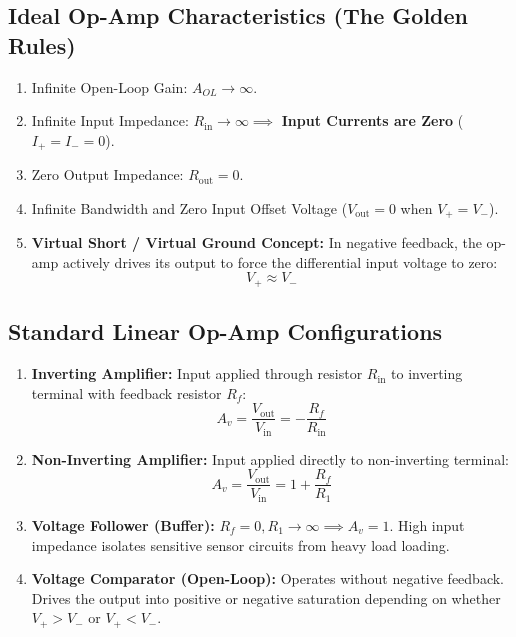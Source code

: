 \subsection{Ideal Op-Amp Characteristics (The Golden Rules)}
\begin{enumerate}[label=\bfseries\arabic*.]
    \item Infinite Open-Loop Gain: $A_{OL} \to \infty$.
    \item Infinite Input Impedance: $R_{\text{in}} \to \infty \implies$ \textbf{Input Currents are Zero} ($I_+ = I_- = 0$).
    \item Zero Output Impedance: $R_{\text{out}} = 0$.
    \item Infinite Bandwidth and Zero Input Offset Voltage ($V_{\text{out}} = 0$ when $V_+ = V_-$).
    \item \textbf{Virtual Short / Virtual Ground Concept:} In negative feedback, the op-amp actively drives its output to force the differential input voltage to zero:
    \begin{equation}
    \label{eq:virtual_short}
    V_+ \approx V_-
    \end{equation}
\end{enumerate}

\subsection{Standard Linear Op-Amp Configurations}
\begin{enumerate}[label=\bfseries\arabic*.]
    \item \textbf{Inverting Amplifier:} Input applied through resistor $R_{\text{in}}$ to inverting terminal with feedback resistor $R_f$:
    \begin{equation}
    \label{eq:inverting_opamp}
    \boxed{A_v = \frac{V_{\text{out}}}{V_{\text{in}}} = -\frac{R_f}{R_{\text{in}}}}
    \end{equation}
    \item \textbf{Non-Inverting Amplifier:} Input applied directly to non-inverting terminal:
    \begin{equation}
    \label{eq:noninverting_opamp}
    \boxed{A_v = \frac{V_{\text{out}}}{V_{\text{in}}} = 1 + \frac{R_f}{R_1}}
    \end{equation}
    \item \textbf{Voltage Follower (Buffer):} $R_f = 0, R_1 \to \infty \implies A_v = 1$. High input impedance isolates sensitive sensor circuits from heavy load loading.
    \item \textbf{Voltage Comparator (Open-Loop):} Operates without negative feedback. Drives the output into positive or negative saturation depending on whether $V_+ > V_-$ or $V_+ < V_-$.
\end{enumerate}


